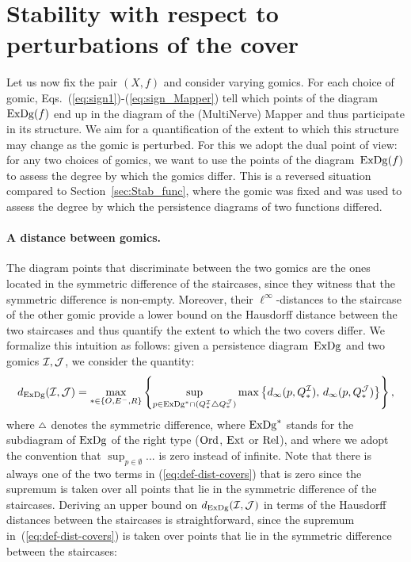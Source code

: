 

\section{Stability with respect to perturbations of the cover}
\label{sec:Stab_cover}

Let us now fix the pair $(X,f)$ and consider varying gomics.  For each
choice of gomic, 
Eqs.~(\ref{eq:sign1})-(\ref{eq:sign_Mapper}) tell which points
of the diagram~$\mathrm{ExDg}(f)$ end up in the diagram of the (MultiNerve)
Mapper and thus participate in its structure. We aim for a
quantification of the extent to which this structure may change as the
gomic is perturbed.  For this we adopt the dual point of view: for any
two choices of gomics, we want to use the points of the
diagram~$\mathrm{ExDg}(f)$ to assess the degree by which the gomics differ.
This is a reversed situation compared to Section~\ref{sec:Stab_func},
where the gomic was fixed and was used to assess the degree by which
the persistence diagrams of two functions differed.

\paragraph*{A distance between gomics.} The diagram points that discriminate between the two gomics are the
ones located in the symmetric difference of the staircases, since they
witness that the symmetric difference is
non-empty. Moreover, their $\ell^\infty$-distances to the staircase of
the other gomic provide a lower bound on the Hausdorff distance
between the two staircases and thus quantify the extent to which the
two covers differ. We formalize this intuition as follows: given a
persistence diagram~$\mathrm{ExDg}$ and two gomics $\mathcal{I}, \mathcal{J}$, we consider the
quantity:
%
\begin{equation}\label{eq:def-dist-covers}
d_{\mathrm{ExDg}}(\mathcal{I}, \mathcal{J}) = \max_{*\in \{O, {E^-}, R\}}
\left\{ \sup_{p\in \mathrm{ExDg}^*\cap (Q_*^{\mathcal{I}} {\scriptstyle\triangle} Q_*^{\mathcal{J}})} \max\left\{ d_\infty(p, Q_*^{\mathcal{I}}),\, d_\infty(p, Q_*^{\mathcal{J}})\right\}
\right\},
\end{equation}
% 
where ${\scriptstyle\triangle}$ denotes the symmetric difference, where $\mathrm{ExDg}^*$ stands
for the subdiagram of $\mathrm{ExDg}$ of the right type ($\mathrm{Ord}$, $\mathrm{Ext}$ or
$\mathrm{Rel}$), and where we adopt the convention that $\sup_{p\in
  \emptyset} ... $ is zero instead of infinite.  Note that there is
always one of the two terms in (\ref{eq:def-dist-covers}) that is zero
since the supremum is taken over all points that lie in the symmetric
difference of the staircases.  Deriving an upper bound on $d_{\mathrm{ExDg}}(\mathcal{I},\mathcal{J})$ 
in terms of the Hausdorff distances between the staircases is
straightforward, since the supremum in~(\ref{eq:def-dist-covers}) is
taken over points that lie in the symmetric difference between the
staircases:

